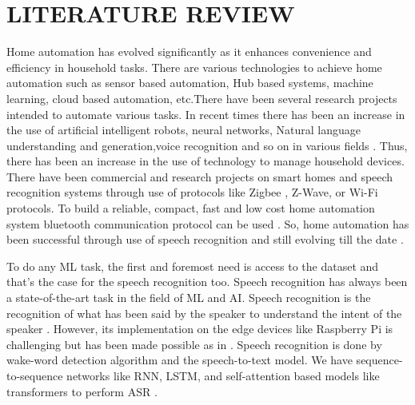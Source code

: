 \chapter{LITERATURE REVIEW}
Home automation has evolved significantly as it enhances convenience and efficiency in household tasks. There are various technologies to achieve home automation such as sensor based automation, Hub based systems, machine learning, cloud based automation, etc.There have been several research projects intended to automate various tasks. In recent times there has been an increase in the use of artificial intelligent robots, neural networks, Natural language understanding and generation,voice recognition and so on in various fields \cite{adekola2019voice}. Thus, there has been an increase in the use of technology to manage household devices. There have been commercial and research projects on smart homes and speech recognition systems through use of protocols like Zigbee \cite{alshu2011voice}, Z-Wave, or Wi-Fi protocols. To build a reliable, compact, fast and low cost home automation system bluetooth communication protocol can be used \cite{das2016bluetooth}. So, home automation has been successful through use of speech recognition \cite{adekola2019voice}\cite{alshu2011voice} and still evolving till the date \cite{li2022recent}.

To do any ML task, the first and foremost need is access to the dataset and that’s the case for the speech recognition too. Speech recognition has always been a state-of-the-art task in the field of ML and AI. Speech recognition is the recognition of what has been said by the speaker to understand the intent of the speaker \cite{adekola2019voice}. However, its implementation on the edge devices like Raspberry Pi is challenging but has been made possible as in \cite{gondi2021performance}. Speech recognition is done by wake-word detection algorithm and the speech-to-text model. We have sequence-to-sequence networks like RNN, LSTM, and self-attention based models like transformers to perform ASR \cite{benzeghiba2007automatic}.  

